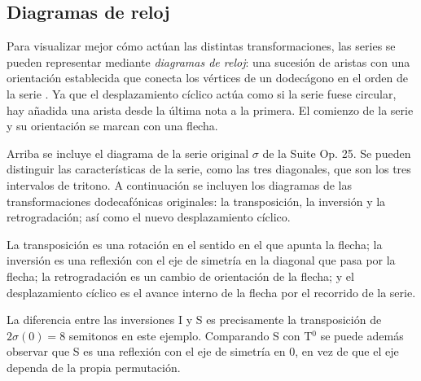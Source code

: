 	\subsection{Diagramas de reloj}
	
		Para visualizar mejor c\'omo act\'uan las distintas transformaciones, las series se pueden representar mediante \textit{diagramas de reloj}: una sucesi\'on de aristas con una orientaci\'on establecida que conecta los v\'ertices de un dodec\'agono en el orden de la serie \cite{hunter}. Ya que el desplazamiento c\'iclico act\'ua como si la serie fuese circular, hay a\~nadida una arista desde la \'ultima nota a la primera. El comienzo de la serie y su orientaci\'on se marcan con una flecha.
		
		\begin{figure}[h]
			\begin{center}				
			\end{center}
		\end{figure} 
		
		Arriba se incluye el diagrama de la serie original $\sigma$ de la Suite Op. 25. Se pueden distinguir las caracter\'isticas de la serie, como las tres diagonales, que son los tres intervalos de tritono. A continuaci\'on se incluyen los diagramas de las transformaciones dodecaf\'onicas originales: la transposici\'on, la inversi\'on y la retrogradaci\'on; as\'i como el nuevo desplazamiento c\'iclico.
		
	\begin{center}
		\begin{multicols}{4}
	\end{multicols}
	\end{center}
		
		La transposici\'on es una rotaci\'on en el sentido en el que apunta la flecha; la inversi\'on es una reflexi\'on con el eje de simetr\'ia en la diagonal que pasa por la flecha; la retrogradaci\'on es un cambio de orientaci\'on de la flecha; y el desplazamiento c\'iclico es el avance interno de la flecha por el recorrido de la serie.		
		
		La diferencia entre las inversiones I y S es precisamente la transposici\'on de $2\sigma(0)=8$ semitonos en este ejemplo. Comparando S con T$^0$ se puede adem\'as observar que S es una reflexi\'on con el eje de simetr\'ia en 0, en vez de que el eje dependa de la propia permutaci\'on.
		
